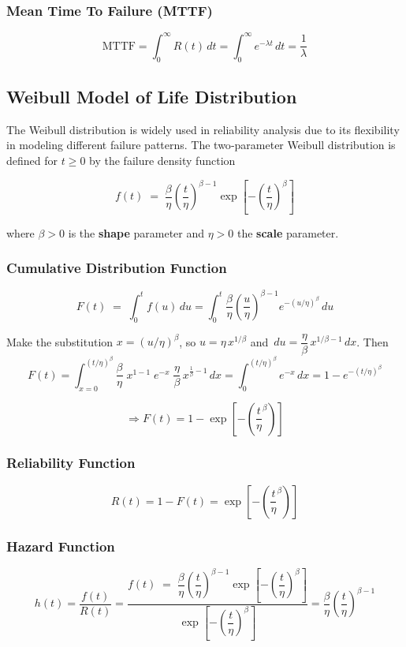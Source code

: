 \documentclass[twoside]{book}
\begin{document}
\subsubsection{Mean Time To Failure (MTTF)}
\[
\text{MTTF} = \int_0^\infty R(t)\, dt= \int_0^\infty e^{-\lambda t} \, dt = \frac{1}{\lambda}
\]

\subsection{Weibull Model of Life Distribution}

The Weibull distribution is widely used in reliability analysis due to its flexibility in modeling different failure patterns. The two‐parameter Weibull distribution is defined for \(t \ge 0\) by the failure density function
\begin{textbox}
\[
f(t) \;=\; \dfrac{\beta}{\eta}\left( \dfrac{t}{\eta}\right)^{\beta-1}
\exp\left[-\left( \dfrac{t}{\eta}\right)^\beta\right]
\]
\end{textbox}
where \(\beta>0\) is the \textbf{shape} parameter and \(\eta>0\) the \textbf{scale} parameter.

\medskip

\subsubsection{Cumulative Distribution Function}
\[
F(t)\;=\;\int_0^t f(u)\,du
=\int_0^t \dfrac{\beta}{\eta}\left( \dfrac{u}{\eta}\right) ^{\beta-1}
e^{-(u/\eta)^\beta}\,du
\]

Make the substitution \(x=(u/\eta)^\beta\), so \(u = \eta\,x^{1/\beta}\) and
\(\,du = \dfrac{\eta}{\beta}\,x^{1/\beta - 1}\,dx\).  Then
\[
F(t)
= \int_{x=0}^{(t/\eta)^\beta}
\frac{\beta}{\eta}\;x^{1 - 1}\;e^{-x}\;\dfrac{\eta}{\beta}\,x^{\tfrac{1}{\beta}-1}\,dx
= \int_{0}^{(t/\eta)^\beta} e^{-x}\,dx
= 1 - e^{-(t/\eta)^\beta}
\]

\[
\Rightarrow F(t) = 1 - \exp\left[-\left( \dfrac{t}{\eta}^\beta\right)\right]
\]

\subsubsection{Reliability Function}
$$R(t) = 1-F(t) =  \exp\left[-\left( \dfrac{t}{\eta}^\beta\right)\right]$$

\subsubsection{Hazard Function}
\[
h(t)=\dfrac{f(t)}{R(t)}
= \dfrac{f(t) \;=\; \dfrac{\beta}{\eta}\left( \dfrac{t}{\eta}\right)^{\beta-1}
\exp\left[-\left( \dfrac{t}{\eta}\right)^\beta\right]}
       {\exp\left[-\left( \dfrac{t}{\eta}\right)^\beta\right]}
= \dfrac{\beta}{\eta}\left( \frac{t}{\eta}\right)^{\beta-1}
\]
\end{document}
